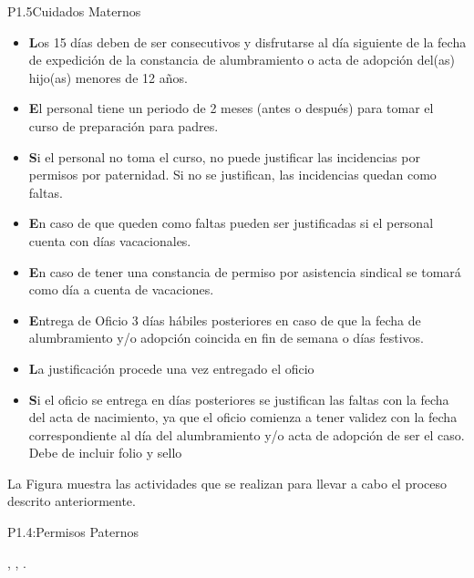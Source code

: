 \begin{Proceso}{P1.5}{Cuidados Maternos}
{    \begin{itemize} 
    	\item \textbf Los 15 días deben de ser consecutivos y disfrutarse al día siguiente de la fecha de expedición de la constancia de alumbramiento o acta de adopción del(as) hijo(as) menores de 12 años. 
       	\item \textbf El personal tiene un periodo de 2 meses (antes o después) para tomar el curso de preparación  para padres.
        \item \textbf Si el personal no toma el curso, no puede justificar las incidencias por permisos por paternidad. Si no se justifican, las incidencias quedan como faltas.
        \item \textbf En caso de que queden como faltas pueden ser justificadas si el personal cuenta con días vacacionales. 
	    \item \textbf En caso de tener una constancia de permiso por asistencia sindical se tomará como día a cuenta de vacaciones. 
    	\item \textbf Entrega de Oficio 3 días hábiles posteriores en caso de que la fecha de alumbramiento y/o adopción coincida en fin de semana o días festivos. 
	    \item \textbf La justificación procede una vez entregado el oficio 
   	    \item \textbf Si el oficio se entrega en días posteriores se justifican las faltas con la fecha del acta de nacimiento, ya que el oficio comienza a tener validez con la fecha correspondiente al día del alumbramiento  y/o  acta de adopción de ser el caso.  Debe de incluir folio y sello

     
    \end{itemize}
   

    
    \smallskip
    \noindent La Figura  muestra las actividades que se realizan para llevar a cabo el proceso descrito anteriormente.

    }{P1.4:Permisos Paternos}


     { %
        ,
        ,
        .
    }


\end{Proceso}
